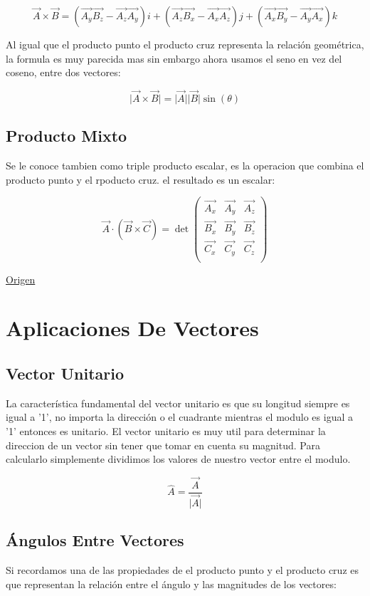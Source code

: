 \documentclass{article}
\begin{document}
\[
\vec{A} \times \vec{B} = 
  (\vec{A_y}\vec{B_z} - \vec{A_z}\vec{A_y})i + 
  (\vec{A_z}\vec{B_x} - \vec{A_x}\vec{A_z})j + 
  (\vec{A_x}\vec{B_y} - \vec{A_y}\vec{A_x})k
\]

Al igual que el producto punto el producto cruz representa la relación geométrica, la formula es muy parecida mas sin embargo ahora usamos el seno en vez del coseno, entre dos vectores:

\[
\vert \vec{A}\times\vec{B}\vert = \vert\vec{A}\vert\vert\vec{B}\vert \sin(\theta)
\]

\subsection{Producto Mixto}
\label{sec:orge2305ca}
Se le conoce tambien como triple producto escalar, es la operacion que combina el producto punto y el rpoducto cruz. el resultado es un escalar:

\[
\vec{A}\cdot(\vec{B}\times\vec{C}) = \det\begin{pmatrix}
  \vec{A_x} & \vec{A_y} & \vec{A_z}\\
  \vec{B_x} & \vec{B_y} & \vec{B_z}\\
  \vec{C_x} & \vec{C_y} & \vec{C_z}\\
\end{pmatrix}
\]

\href{https://es.wikipedia.org/wiki/Producto\_mixto}{Origen}

\section{Aplicaciones De Vectores}
\label{sec:org4d03fed}
\subsection{Vector Unitario}
\label{sec:org1548655}
La característica fundamental del vector unitario es que su longitud siempre es igual a '1', no importa la dirección o el cuadrante mientras el modulo es igual a '1' entonces es unitario. El vector unitario es muy util para determinar la direccion de un vector sin tener que tomar en cuenta su magnitud. Para calcularlo simplemente dividimos los valores de nuestro vector entre el modulo.

\[ 
\hat{A} = \frac{\vec{A}}{\vert\vec{A}\vert} 
\]

\subsection{Ángulos Entre Vectores}
\label{sec:org4d65368}
Si recordamos una de las propiedades de el producto punto y el producto cruz es que representan la relación entre el ángulo y las magnitudes de los vectores:
\end{document}
